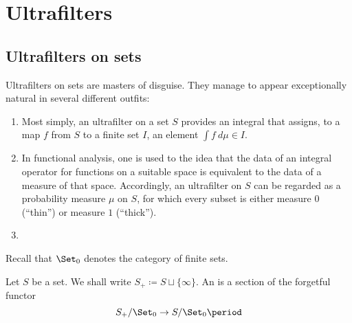 
\section{Ultrafilters}%
\label{sec:ultrafilters}

\subsection{Ultrafilters on sets}%
\label{sub:ultrafilters_on_sets}

Ultrafilters on sets are masters of disguise.
They manage to appear exceptionally natural
in several different outfits:
\begin{enumerate}
	\item Most simply, an ultrafilter on a set $ S $
		provides an integral that assigns,
		to a map $ f $ from $ S $ to a finite set $ I $,
		an element $ \int f \ d\mu \in I $.
	\item In functional analysis, one is used to the idea
		that the data of an integral operator
		for functions on a suitable space
		is equivalent to
		the data of a measure of that space.
		Accordingly, an ultrafilter on $ S $ can be regarded
		as a probability measure $ \mu $ on $ S $,
		for which every subset is
		either measure $ 0 $ (\enquote{thin}) or
		measure $ 1 $ (\enquote{thick}).
	\item 
\end{enumerate}

\begin{nul}
	Recall that $ \Set_0 $ denotes the category of finite sets.
\end{nul}

\begin{definition}%
	\label{dfn:ultrafilter}
	Let $ S $ be a set.
	We shall write $ S_+ \coloneq S \sqcup \{ \infty \} $.
	An  is a section of the forgetful functor
	\[ S_+/\Set_0 \to S/\Set_0 \period \]
\end{definition}

